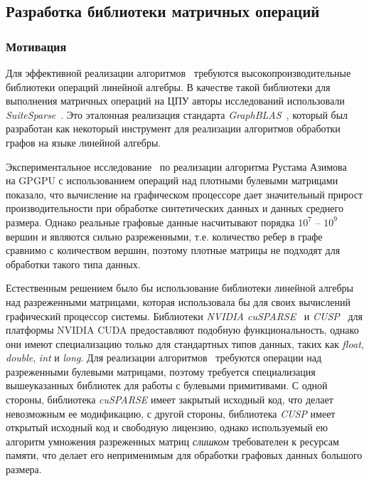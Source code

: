 
\subsection{Разработка библиотеки матричных операций}
 
\subsubsection{Мотивация}

Для эффективной реализации алгоритмов~\cite{inbook:kronecker_cfpq_adbis, inproceedings:matrix_cfpq} требуются высокопроизводительные библиотеки операций линейной алгебры. В качестве такой библиотеки для выполнения матричных операций на ЦПУ авторы исследований использовали \textit{SuiteSparse}~\cite{net:suite_sparse}. Это эталонная реализация стандарта \textit{GraphBLAS}~\cite{net:graphblas}, который был разработан как некоторый инструмент для реализации алгоритмов обработки графов на языке линейной алгебры.  

Экспериментальное исследование~\cite{inproceedings:cfpq_matrix_evaluation} по реализации алгоритма Рустама Азимова~\cite{inproceedings:matrix_cfpq} на GPGPU с использованием операций над плотными булевыми матрицами показало, что вычисление на графическом процессоре дает значительный прирост производительности при обработке синтетических данных и данных среднего размера. Однако реальные графовые данные насчитывают порядка $10^7$ -- $10^9$ вершин и являются сильно разреженными, т.е. количество ребер в графе сравнимо с количеством вершин, поэтому плотные матрицы не подходят для обработки такого типа данных. 

Естественным решением было бы использование библиотеки линейной алгебры над разреженными матрицами, которая использовала бы для своих вычислений графический процессор системы. Библиотеки \textit{NVIDIA cuSPARSE}~\cite{net:cusparse_docs} и \textit{CUSP}~\cite{net:cusplibrary} для платформы NVIDIA CUDA предоставляют подобную функциональность, однако они имеют специализацию только для стандартных типов данных, таких как \textit{float}, \textit{double}, \textit{int} и \textit{long}. Для реализации алгоритмов~\cite{inbook:kronecker_cfpq_adbis, inproceedings:matrix_cfpq} требуются операции над разреженными булевыми матрицами, поэтому требуется специализация вышеуказанных библиотек для работы с булевыми примитивами. С одной стороны, библиотека \textit{cuSPARSE} имеет закрытый исходный код, что делает невозможным ее модификацию, с другой стороны, библиотека \textit{CUSP} имеет открытый исходный код и свободную лицензию, однако используемый ею алгоритм умножения разреженных матриц \textit{слишком} требователен к ресурсам памяти, что делает его неприменимым для обработки графовых данных большого размера.

